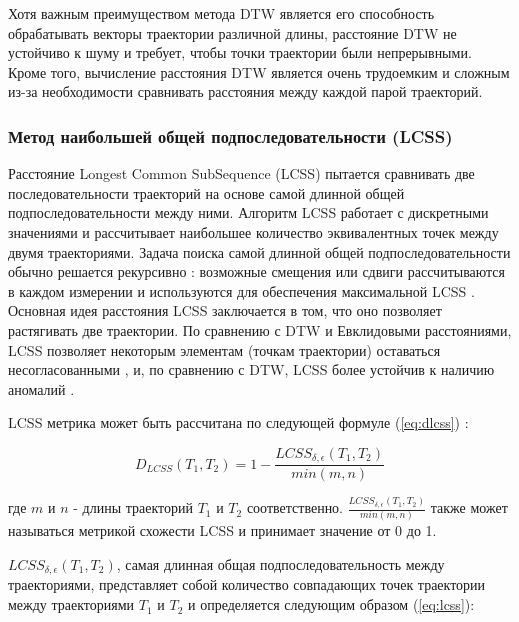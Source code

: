 Хотя важным преимуществом метода DTW является его способность обрабатывать векторы траектории различной длины, расстояние DTW не устойчиво к шуму и требует, чтобы точки траектории были непрерывными. Кроме того, вычисление расстояния DTW является очень трудоемким и сложным из-за необходимости сравнивать расстояния между каждой парой траекторий.

\subsubsection{Метод наибольшей общей подпоследовательности (LCSS)}

Расстояние Longest Common SubSequence (LCSS) пытается сравнивать две последовательности траекторий на основе самой длинной общей подпоследовательности между ними. Алгоритм LCSS работает с дискретными значениями и рассчитывает наибольшее количество эквивалентных точек между двумя траекториями. Задача поиска самой длинной общей подпоследовательности обычно решается рекурсивно \cite{article:8_review_mot_cl_alg}: возможные смещения или сдвиги рассчитываются в каждом измерении и используются для обеспечения максимальной LCSS \cite{online:r_lcss}. Основная идея расстояния LCSS заключается в том, что оно позволяет растягивать две траектории. По сравнению с DTW и Евклидовыми расстояниями, LCSS позволяет некоторым элементам (точкам траектории) оставаться несогласованными \cite{article:tr_sim_meas}, и, по сравнению с DTW, LCSS более устойчив к наличию аномалий \cite{article:ind_mult_ts}.

LCSS метрика может быть рассчитана по следующей формуле (\ref{eq:dlcss}) \cite{inproceedings:7_related_work}:

\begin{equation} \label{eq:dlcss}
	D_{LCSS}(T_1, T_2) = 1 - \frac {LCSS_{\delta, \epsilon}(T_1, T_2)} {min(m, n)}
\end{equation}

где $m$ и $n$ - длины траекторий $T_1$ и $T_2$ соответственно. $\frac{LCSS_{\delta, \epsilon}(T_1, T_2)}{min(m, n)}$ также может называться метрикой схожести LCSS и принимает значение от 0 до 1.

$LCSS_{\delta, \epsilon}(T_1, T_2)$, самая длинная общая подпоследовательность между траекториями, представляет собой количество совпадающих точек траектории между траекториями $T_1$ и $T_2$ и определяется следующим образом (\ref{eq:lcss}):

